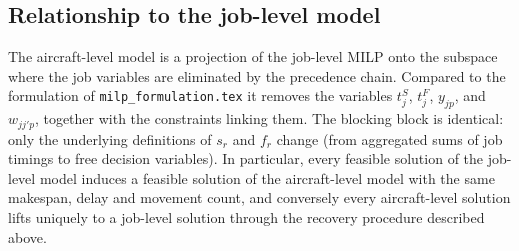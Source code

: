 \subsection{Relationship to the job-level model}

The aircraft-level model is a projection of the job-level MILP onto the
subspace where the job variables are eliminated by the precedence chain.
Compared to the formulation of \texttt{milp\_formulation.tex} it removes
the variables $t^S_j$, $t^F_j$, $y_{jp}$, and $w_{jj'p}$, together with the
constraints linking them.  The blocking block is identical: only the
underlying definitions of $s_r$ and $f_r$ change (from aggregated sums of
job timings to free decision variables).  In particular, every feasible
solution of the job-level model induces a feasible solution of the
aircraft-level model with the same makespan, delay and movement count, and
conversely every aircraft-level solution lifts uniquely to a job-level
solution through the recovery procedure described above.
